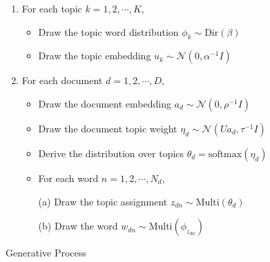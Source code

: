 \documentclass[sigconf]{acmart}
\renewcommand*{\bm}[1]{#1}%
\begin{document}
\begin{algorithm}[t]
\begin{enumerate}[1.]
   \item For each topic $k = 1, 2, \cdots, K$,
  \begin{itemize}
   \item Draw the topic word distribution $\bm{\phi_k} \sim \text{Dir}(\beta)$ 
   \item Draw the topic embedding $\bm{u}_k \sim \mathcal{N}(\bm{0}, \alpha^{-1}\bm{I})$
  \end{itemize}
  \item For each document $d = 1, 2, \cdots, D$,
   \begin{itemize}
    \item Draw the document embedding $\bm{a}_d \sim \mathcal{N}(\bm{0}, \rho^{-1}\bm{I})$
    \item Draw the document topic weight $\bm{\eta}_d \sim \mathcal{N}(\bm{U}\bm{a}_d, \tau^{-1}\bm{I})$
    \item Derive the distribution over topics $\bm{\theta}_d = \text{softmax}(\bm{\eta}_d)$
    \item For each word $n = 1, 2, \cdots, N_d$,\par
    (a) Draw the topic assignment $z_{dn} \sim \text{Multi}(\bm{\theta}_d)$\par
    (b) Draw the word $w_{dn} \sim \text{Multi}(\bm{\phi}_{z_{dn}})$
   \end{itemize}
\end{enumerate}
\caption{Generative Process}
\label{algo:gen}
\end{algorithm}
\end{document}
